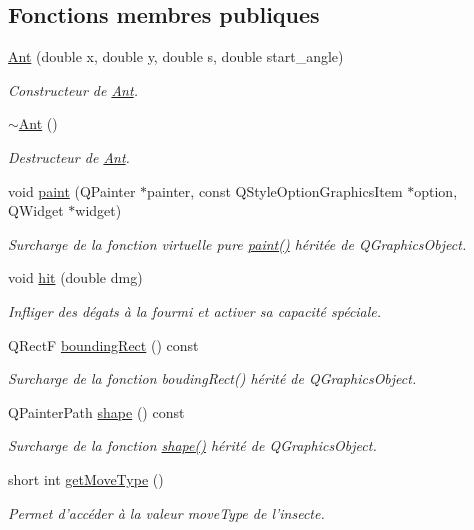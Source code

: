 \subsection*{Fonctions membres publiques}
\begin{DoxyCompactItemize}
\item 
\hyperlink{classAnt_a52f0aed092463606f4d4edd2091d92eb}{Ant} (double x, double y, double s, double start\_\-angle)
\begin{DoxyCompactList}\small\item\em Constructeur de \hyperlink{classAnt}{Ant}. \end{DoxyCompactList}\item 
\hyperlink{classAnt_a33ca6bd592236726a18a2159908e4116}{$\sim$Ant} ()
\begin{DoxyCompactList}\small\item\em Destructeur de \hyperlink{classAnt}{Ant}. \end{DoxyCompactList}\item 
void \hyperlink{classAnt_abb2b56b817ce45d815251549a77402be}{paint} (QPainter $\ast$painter, const QStyleOptionGraphicsItem $\ast$option, QWidget $\ast$widget)
\begin{DoxyCompactList}\small\item\em Surcharge de la fonction virtuelle pure \hyperlink{classAnt_abb2b56b817ce45d815251549a77402be}{paint()} héritée de QGraphicsObject. \end{DoxyCompactList}\item 
void \hyperlink{classAnt_a64b0e0e7d2605c1a5a0906587ab70920}{hit} (double dmg)
\begin{DoxyCompactList}\small\item\em Infliger des dégats à la fourmi et activer sa capacité spéciale. \end{DoxyCompactList}\item 
QRectF \hyperlink{classBug_a9b39c25361faad07b1bf2dd927d09dab}{boundingRect} () const 
\begin{DoxyCompactList}\small\item\em Surcharge de la fonction boudingRect() hérité de QGraphicsObject. \end{DoxyCompactList}\item 
QPainterPath \hyperlink{classBug_a587a36d3145c2b4dba6c689af22c65ac}{shape} () const 
\begin{DoxyCompactList}\small\item\em Surcharge de la fonction \hyperlink{classBug_a587a36d3145c2b4dba6c689af22c65ac}{shape()} hérité de QGraphicsObject. \end{DoxyCompactList}\item 
short int \hyperlink{classBug_aced471cedcfa855baddf4c827003e755}{getMoveType} ()
\begin{DoxyCompactList}\small\item\em Permet d'accéder à la valeur moveType de l'insecte. \end{DoxyCompactList}\end{DoxyCompactItemize}
